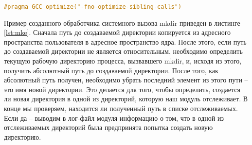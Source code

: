 \documentclass[a4paper,14pt]{article}
\begin{document}
\begin{lstlisting}[language=C++,label={lst:tail}, caption=\text{Отключение оптимизации хвостовых вызовов.}]
#pragma GCC optimize("-fno-optimize-sibling-calls")
\end{lstlisting}

Пример созданного обработчика системного вызова mkdir приведен в листинге \ref{lst:mke}. Сначала путь до создаваемой директории копируется из адресного пространства пользователя в адресное пространство ядра. После этого, если путь до создаваемой директории не является относительным, необходимо определить текущую рабочую директорию процесса, вызвавшего mkdir, и, исходя из этого, получить абсолютный путь до создаваемой директории. После того, как абсолютный путь получен, необходимо убрать последний элемент из этого пути -- это имя новой директории. Это делается для того, чтобы определить, создается ли новая директория в одной из директорий, которую наш модуль отслеживает. В конце мы проверяем, находится ли полученный путь в списке отслеживаемых. Если да -- выводим в лог-файл модуля информацию о том, что в одной из отслеживаемых директорий была предпринята попытка создать новую директорию.
\end{document}
